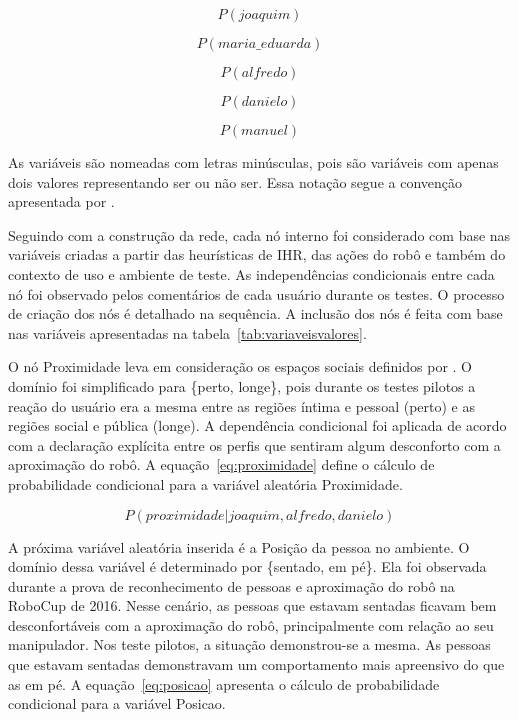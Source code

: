 \begin{equation}
	\label{eq:joaquim}
	P(joaquim)
\end{equation}

\begin{equation}
	\label{eq:mariaeduarda}
	P(maria\_eduarda)
\end{equation}

\begin{equation}
	\label{eq:alfredo}
	P(alfredo)
\end{equation}

\begin{equation}
	\label{eq:danielo}
	P(danielo)
\end{equation}

\begin{equation}
	\label{eq:manuel}
	P(manuel)
\end{equation}

As variáveis são nomeadas com letras minúsculas, pois são variáveis com apenas dois valores representando ser ou não ser. Essa notação segue a convenção apresentada por .

Seguindo com a construção da rede, cada nó interno foi considerado com base nas variáveis criadas a partir das heurísticas de IHR, das ações do robô e também do contexto de uso e ambiente de teste. As independências condicionais entre cada nó foi observado pelos comentários de cada usuário durante os testes. O processo de criação dos nós é detalhado na sequência. A inclusão dos nós é feita com base nas variáveis apresentadas na tabela~\ref{tab:variaveisvalores}.

O nó Proximidade leva em consideração os espaços sociais definidos por . O domínio foi simplificado para \{perto, longe\}, pois durante os testes pilotos a reação do usuário era a mesma entre as regiões íntima e pessoal (perto) e as regiões social e pública (longe). A dependência condicional foi aplicada de acordo com a declaração explícita entre os perfis que sentiram algum desconforto com a aproximação do robô. A equação~\ref{eq:proximidade} define o cálculo de probabilidade condicional para a variável aleatória Proximidade.

\begin{equation}
	\label{eq:proximidade}
	P(proximidade | joaquim, alfredo, danielo)
\end{equation}

A próxima variável aleatória inserida é a Posição da pessoa no ambiente. O domínio dessa variável é determinado por \{sentado, em pé\}. Ela foi observada durante a prova de reconhecimento de pessoas e aproximação do robô na RoboCup de 2016. Nesse cenário, as pessoas que estavam sentadas ficavam bem desconfortáveis com a aproximação do robô, principalmente com relação ao seu manipulador. Nos teste pilotos, a situação demonstrou-se a mesma. As pessoas que estavam sentadas demonstravam um comportamento mais apreensivo do que as em pé. A equação~\ref{eq:posicao} apresenta o cálculo de probabilidade condicional para a variável Posicao.

